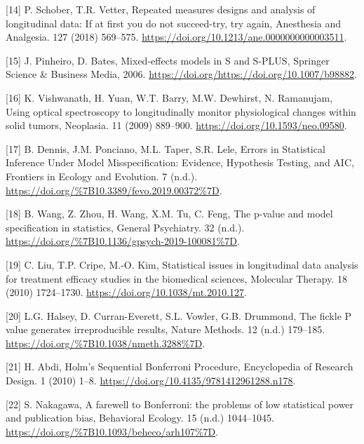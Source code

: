 \documentclass[
]{article}
\begin{document}
\leavevmode\hypertarget{ref-schober2018}{}%
{[}14{]} P. Schober, T.R. Vetter, Repeated measures designs and analysis of longitudinal data: If at first you do not succeed-try, try again, Anesthesia and Analgesia. 127 (2018) 569--575. \url{https://doi.org/10.1213/ane.0000000000003511}.

\leavevmode\hypertarget{ref-pinheiro2006}{}%
{[}15{]} J. Pinheiro, D. Bates, Mixed-effects models in S and S-PLUS, Springer Science \& Business Media, 2006. \url{https://doi.org/https://doi.org/10.1007/b98882}.

\leavevmode\hypertarget{ref-vishwanath2009}{}%
{[}16{]} K. Vishwanath, H. Yuan, W.T. Barry, M.W. Dewhirst, N. Ramanujam, Using optical spectroscopy to longitudinally monitor physiological changes within solid tumors, Neoplasia. 11 (2009) 889--900. \url{https://doi.org/10.1593/neo.09580}.

\leavevmode\hypertarget{ref-dennis2019}{}%
{[}17{]} B. Dennis, J.M. Ponciano, M.L. Taper, S.R. Lele, Errors in Statistical Inference Under Model Misspecification: Evidence, Hypothesis Testing, and AIC, Frontiers in Ecology and Evolution. 7 (n.d.). \url{https://doi.org/\%7B10.3389/fevo.2019.00372\%7D}.

\leavevmode\hypertarget{ref-wang2019}{}%
{[}18{]} B. Wang, Z. Zhou, H. Wang, X.M. Tu, C. Feng, The p-value and model specification in statistics, General Psychiatry. 32 (n.d.). \url{https://doi.org/\%7B10.1136/gpsych-2019-100081\%7D}.

\leavevmode\hypertarget{ref-liu2010}{}%
{[}19{]} C. Liu, T.P. Cripe, M.-O. Kim, Statistical issues in longitudinal data analysis for treatment efficacy studies in the biomedical sciences, Molecular Therapy. 18 (2010) 1724--1730. \url{https://doi.org/10.1038/mt.2010.127}.

\leavevmode\hypertarget{ref-halsey2015}{}%
{[}20{]} L.G. Halsey, D. Curran-Everett, S.L. Vowler, G.B. Drummond, The fickle P value generates irreproducible results, Nature Methods. 12 (n.d.) 179--185. \url{https://doi.org/\%7B10.1038/nmeth.3288\%7D}.

\leavevmode\hypertarget{ref-abdi2010}{}%
{[}21{]} H. Abdi, Holm's Sequential Bonferroni Procedure, Encyclopedia of Research Design. 1 (2010) 1--8. \url{https://doi.org/10.4135/9781412961288.n178}.

\leavevmode\hypertarget{ref-nakagawa2004}{}%
{[}22{]} S. Nakagawa, A farewell to Bonferroni: the problems of low statistical power and publication bias, Behavioral Ecology. 15 (n.d.) 1044--1045. \url{https://doi.org/\%7B10.1093/beheco/arh107\%7D}.
\end{document}
